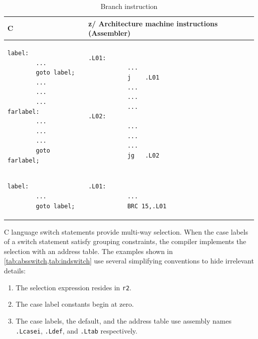 \documentclass[USenglish,fontsize=11pt,twoside,%
  toc=bib,toc=idx,toc=graduated,numbers=noendperiod,
  bookmarks=true,
  bookmarksnumbered=true,
  bookmarksopen=true,
  bookmarksopenlevel=1,
  breaklinks=true,
  colorlinks=true,
  linkcolor=black,
  pdfpagelayout={TwoPageRight},
  pdfusetitle=true
]{scrreprt}
\newcommand{\ARCH}{z/\kern-1pt Ar\-chi\-tec\-ture}
\newcommand{\ARCH}{ESA/390}
\newenvironment{DIFnomarkup}{}{} %
\begin{document}
\begin{table}
  \centering
  \begin{DIFnomarkup}
  \begin{tabular}{p{}p{}}
    \toprule
    C & \ARCH{} machine instructions (Assembler) \\
    \midrule
    \ifzseries
\begin{lstlisting}[style=short]
label:
        ...
        goto label;
        ...
        ...
        ...
farlabel:
        ...
        ...
        ...
        goto farlabel;
\end{lstlisting}
    &
\begin{lstlisting}[style=short,language=simpleasm]
.L01:
           ...
           j    .L01
           ...
           ...
           ...
.L02:
           ...
           ...
           ...
           jg   .L02
\end{lstlisting} \\
    \else
\begin{lstlisting}[style=short]
label:
        ...
        goto label;
\end{lstlisting}
    &
\begin{lstlisting}[style=short,language=simpleasm]
.L01:
           ...
           BRC 15,.L01
\end{lstlisting}
\fi \\
    \bottomrule
  \end{tabular}
  \end{DIFnomarkup}
  \caption{Branch instruction}
  \label{tab:branchinsn}
\end{table}

C language switch statements provide multi-way selection.  When the case
labels of a switch statement satisfy grouping constraints, the compiler
implements the selection with an address table.  The examples shown in
\cref{tab:absswitch,tab:indswitch} use several simplifying conventions to
hide irrelevant details:
\begin{enumerate}
\item The selection expression resides in \texttt{r2}.
\item The case label constants begin at zero.
\item The case labels, the default, and the address table use assembly
  names \texttt{.Lcasei}, \texttt{.Ldef}, and \texttt{.Ltab} respectively.
\end{enumerate}
\end{document}
